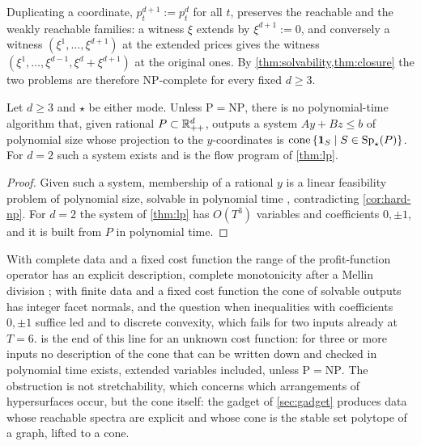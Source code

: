 Duplicating a coordinate, $p^{d+1}_t:=p^d_t$ for all $t$, preserves the reachable and the weakly reachable families: a witness $\xi$ extends by $\xi^{d+1}:=0$, and conversely a witness $(\xi^1,\dots,\xi^{d+1})$ at the extended prices gives the witness $(\xi^1,\dots,\xi^{d-1},\xi^d+\xi^{d+1})$ at the original ones. By \cref{thm:solvability,thm:closure} the two problems are therefore NP-complete for every fixed $d\ge3$.

\begin{corollary}\label{cor:extended}
Let $d\ge3$ and $\star$ be either mode. Unless $\mathrm P=\mathrm{NP}$, there is no polynomial-time algorithm that, given rational $P\subset\Rpp[d]$, outputs a system $Ay+Bz\le b$ of polynomial size whose projection to the $y$-coordinates is $\cone\set{\ind S\mid S\in\Spm(P)}$. For $d=2$ such a system exists and is the flow program of \cref{thm:lp}.
\end{corollary}

\begin{proof}
Given such a system, membership of a rational $y$ is a linear feasibility problem of polynomial size, solvable in polynomial time \citep[Ch.~13]{Schrijver1986}, contradicting \cref{cor:hard-np}. For $d=2$ the system of \cref{thm:lp} has $O(T^3)$ variables and coefficients $0,\pm1$, and it is built from $P$ in polynomial time.
\end{proof}

With complete data and a fixed cost function the range of the profit-function operator has an explicit description, complete monotonicity after a Mellin division \citep{HenkinShananin1990,Agaltsov2015}; with finite data and a fixed cost function the cone of solvable outputs has integer facet normals, and the question when inequalities with coefficients $0,\pm1$ suffice led \citet{AgaltsovMolchanovShananin2018} and \citet{Molchanov2013a} to discrete convexity, which fails for two inputs already at $T=6$.  is the end of this line for an unknown cost function: for three or more inputs no description of the cone that can be written down and checked in polynomial time exists, extended variables included, unless $\mathrm P=\mathrm{NP}$. The obstruction is not stretchability, which concerns which arrangements of hypersurfaces occur, but the cone itself: the gadget of \cref{sec:gadget} produces data whose reachable spectra are explicit and whose cone is the stable set polytope of a graph, lifted to a cone.

